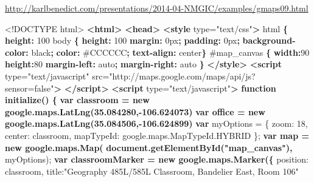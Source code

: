 \documentclass[]{article}
\newenvironment{Shaded}{}{}
\newcommand{\KeywordTok}[1]{\textcolor[rgb]{0.00,0.44,0.13}{\textbf{{#1}}}}
\newcommand{\DataTypeTok}[1]{\textcolor[rgb]{0.56,0.13,0.00}{{#1}}}
\newcommand{\DecValTok}[1]{\textcolor[rgb]{0.25,0.63,0.44}{{#1}}}
\newcommand{\FloatTok}[1]{\textcolor[rgb]{0.25,0.63,0.44}{{#1}}}
\newcommand{\StringTok}[1]{\textcolor[rgb]{0.25,0.44,0.63}{{#1}}}
\newcommand{\OtherTok}[1]{\textcolor[rgb]{0.00,0.44,0.13}{{#1}}}
\newcommand{\FunctionTok}[1]{\textcolor[rgb]{0.02,0.16,0.49}{{#1}}}
\newcommand{\ErrorTok}[1]{\textcolor[rgb]{1.00,0.00,0.00}{\textbf{{#1}}}}
\newcommand{\NormalTok}[1]{{#1}}
\begin{document}
\url{http://karlbenedict.com/presentations/2014-04-NMGIC/examples/gmaps09.html}

\begin{Shaded}
\begin{Highlighting}[numbers=left,,]
\DataTypeTok{<!DOCTYPE }\NormalTok{html}\DataTypeTok{>}
\KeywordTok{<html>}
    \KeywordTok{<head>}
        \KeywordTok{<style}\OtherTok{ type=}\StringTok{"text/css"}\KeywordTok{>}
          \NormalTok{html }\KeywordTok{\{} \KeywordTok{height:} \DataTypeTok{100%
          \NormalTok{body }\KeywordTok{\{} \KeywordTok{height:} \DataTypeTok{100%
            \KeywordTok{margin:} \DataTypeTok{0px}\KeywordTok{;} 
            \KeywordTok{padding:} \DataTypeTok{0px}\KeywordTok{;} 
            \KeywordTok{background-color:} \DataTypeTok{black}\KeywordTok{;} 
            \KeywordTok{color:} \DataTypeTok{#CCCCCC}\KeywordTok{;}
            \KeywordTok{text-align:} \DataTypeTok{center}\KeywordTok{\}}
          \FloatTok{#map_canvas} \KeywordTok{\{} \KeywordTok{width:}\DataTypeTok{90%
            \KeywordTok{height:}\DataTypeTok{80%
            \KeywordTok{margin-left:} \DataTypeTok{auto}\KeywordTok{;} 
            \KeywordTok{margin-right:} \DataTypeTok{auto} \KeywordTok{\}}
        \KeywordTok{</style>}
        \KeywordTok{<script}\OtherTok{ type=}\StringTok{"text/javascript"}
\OtherTok{            src=}\StringTok{"http://maps.google.com/maps/api/js?sensor=false"}\KeywordTok{>}
        \KeywordTok{</script>}
        \KeywordTok{<script}\OtherTok{ type=}\StringTok{"text/javascript"}\KeywordTok{>}
\ErrorTok{          function initialize() \{}
\ErrorTok{            var classroom = new google.maps.LatLng(35.084280,-106.624073)}
\ErrorTok{            var office = new google.maps.LatLng(35.084506,-106.624899)}
            \KeywordTok{var} \NormalTok{myOptions = \{}
              \DataTypeTok{zoom}\NormalTok{: }\DecValTok{18}\NormalTok{,}
              \DataTypeTok{center}\NormalTok{: classroom,}
              \DataTypeTok{mapTypeId}\NormalTok{: }\OtherTok{google}\NormalTok{.}\OtherTok{maps}\NormalTok{.}\OtherTok{MapTypeId}\NormalTok{.}\FunctionTok{HYBRID}
              \NormalTok{\};}
\ErrorTok{            var map = new google.maps.Map(}
\ErrorTok{              document.getElementById("map_canvas"), }
              \NormalTok{myOptions);}
\ErrorTok{            var classroomMarker = new google.maps.Marker(\{}
              \NormalTok{position: classroom,}
              \NormalTok{title:}\StringTok{"Geography 485L/585L Classroom, Bandelier East, Room 106"}
}}}}
\end{Highlighting}
\end{Shaded}
\end{document}
